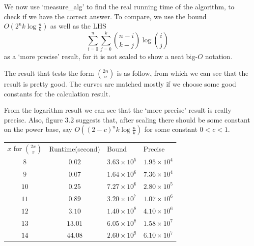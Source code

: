 \documentclass[11pt,a4paper,oneside]{article}
\begin{document}
\begin{problem}{3}
	We now use `measure\_alg' to find the real running time of the algorithm, to check if we have the correct answer. To compare, we use the bound $O(2^{n}k \log{\frac{n}{k}})$ as well as the LHS $$
	\sum_{i = 0}^{n} \sum_{j = 0}^{k} {n - i \choose k - j} \log{i \choose j} 
	$$ as a `more precise' result, for it is not scaled to show a neat big-$O$ notation.

	The result that tests the form ${2n \choose n}$ is as follow, from which we can see that the result is pretty good. The curves are matched mostly if we choose some good constants for the calculation result.

	From the logarithm result we can see that the `more precise' result is really precise. Also, figure 3.2 suggests that, after scaling there should be some constant on the power base, say $O((2-c)^{n}k \log{\frac{n}{k}})$ for some constant $0<c<1$.
	\begin{table}[htbp]
		\centering
		
		\begin{tabular}{cccc}
		\multicolumn{1}{l}{$x$ for ${2x \choose x}$} & \multicolumn{1}{l}{Runtime(second)} & \multicolumn{1}{l}{Bound} & \multicolumn{1}{l}{Precise} \\
		$               8$&$0.02$&$3.63 \times 10^{ 5 }$&$1.95 \times 10^{ 4 }$\\
		$               9$&$0.07$&$1.64 \times 10^{ 6 }$&$7.36 \times 10^{ 4 }$\\
		$               10$&$0.25$&$7.27 \times 10^{ 6 }$&$2.80 \times 10^{ 5 }$\\
		$               11$&$0.89$&$3.20 \times 10^{ 7 }$&$1.07 \times 10^{ 6 }$\\
		$               12$&$3.10$&$1.40 \times 10^{ 8 }$&$4.10 \times 10^{ 6 }$\\
		$               13$&$13.01$&$6.05 \times 10^{ 8 }$&$1.58 \times 10^{ 7 }$\\
		$               14$&$44.08$&$2.60 \times 10^{ 9 }$&$6.10 \times 10^{ 7 }$\\


\end{tabular}
\end{table}
\end{problem}
\end{document}
